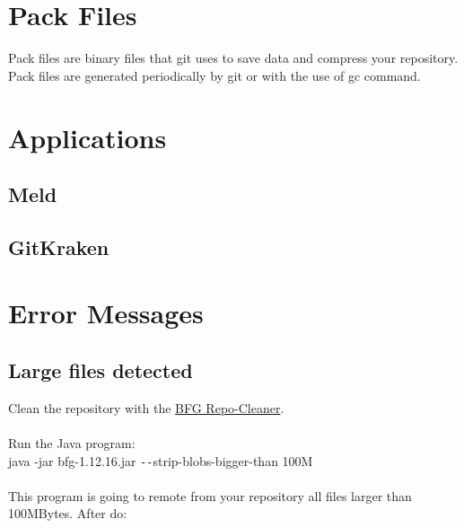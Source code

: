 \begin{refsection}
\section{Pack Files}

Pack files are binary files that git uses to save data and compress your repository. Pack files are generated periodically by git or with the use of gc command.

\section{Applications}

\subsection{Meld}

%
%
%	
%
%
%
%

\subsection{GitKraken}

\section{Error Messages}

\subsection{Large files detected}

Clean the repository with the \href{https://rtyley.github.io/bfg-repo-cleaner}{BFG Repo-Cleaner}.\\
\\
Run the Java program:\\

java -jar bfg-1.12.16.jar \texttt{-{}-}strip-blobs-bigger-than 100M\\
\\
This program is going to remote from your repository all files larger than 100MBytes. After do:\\


\end{refsection}
